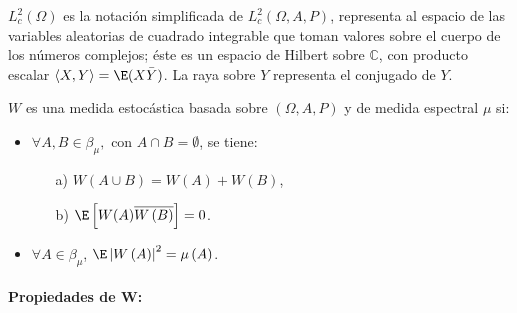 $L_{c}^{2}\left( \Omega  \right)$ es la notaci\'{o}n simplificada de $L_{c}^{2}\left( \Omega ,A,P \right)$, representa al espacio de las variables aleatorias de cuadrado integrable que toman valores sobre el cuerpo de los n\'{u}meros complejos; \'{e}ste es un espacio de Hilbert sobre $\mathbb{C}$, con producto escalar $\langle X,Y\rangle=\E(X\bar{Y})$. La raya sobre $Y$ representa el conjugado de $Y$.

\begin{definicion}
$W$ es una medida estoc\'{a}stica basada sobre $\left( \Omega,A,P \right)$ y de medida espectral $\mu $ si:
\begin{itemize}
\item $\forall A,B\in \beta_{\mu },$ con $A\cap B=\emptyset $, se tiene:
	\begin{enumerate}
	\item[a)] $W\left( A\cup B \right)=W\left( A \right)+W\left( B \right)$,
	\item[b)] $\E\left[ W(A)\overline{W\left( B \right)} \right]=0$.
	\end{enumerate}
\item $\forall A\in \beta_{\mu }$, $\E\left| W\left( A \right) \right|^{2}=\mu \left( A \right)$.
\end{itemize}
\end{definicion}

\paragraph{Propiedades de W:}

